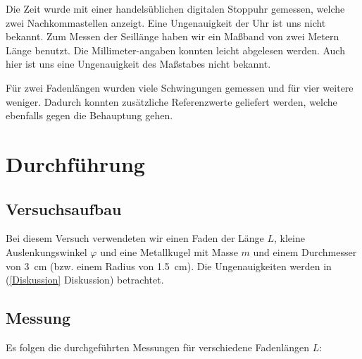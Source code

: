 \documentclass[11pt,a4paper,titlepage, ngerman]{article}
\begin{document}
		Die Zeit wurde mit einer handelsüblichen digitalen Stoppuhr gemessen, welche zwei Nachkommastellen anzeigt.
		Eine Ungenauigkeit der Uhr ist uns nicht bekannt.
		Zum Messen der Seillänge haben wir ein Maßband von zwei Metern Länge benutzt. Die Millimeter-angaben konnten leicht abgelesen werden.
		Auch hier ist uns eine Ungenauigkeit des Maßstabes nicht bekannt.
		
		Für zwei Fadenlängen wurden viele Schwingungen gemessen und für vier weitere weniger.
		Dadurch konnten zusätzliche Referenzwerte geliefert werden, welche ebenfalls gegen die Behauptung gehen.
		
		
		
	
	\section{Durchführung}
		\label{Durchführung}
		
		\subsection{Versuchsaufbau}
		\label{Versuchsaufbau}
			
			Bei diesem Versuch verwendeten wir einen Faden der Länge $L$, kleine Auslenkungswinkel $\varphi$ und eine Metallkugel mit Masse $m$ und einem Durchmesser von \SI{3}{cm} (bzw. einem Radius von \SI{1,5}{cm}). Die Ungenauigkeiten werden in (\ref{Diskussion} Diskussion) betrachtet.
			\vspace{0.25cm}
		
		\subsection{Messung}
		\label{Messung}
			Es folgen die durchgeführten Messungen für verschiedene Fadenlängen $L$: 
			\vspace{0.25cm} 
			
\end{document}
